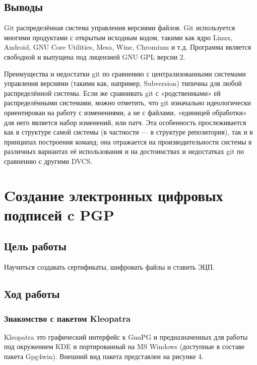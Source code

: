 \documentclass[a4paper, 12pt]{article}		%
\begin{document}
\subsection{Выводы}

Git распределённая система управления версиями файлов. Git используется многими продуктами с открытым исходным кодом, такими как ядро Linux, Android, GNU Core Utilities, Mesa, Wine, Chromium и т.д. Программа является свободной и выпущена под лицензией GNU GPL версии 2.

Преимущества и недостатки git по сравнению с централизованными системами управления версиями (такими как, например, Subversion) типичны для любой распределённой системы. Если же сравнивать git с «родственными» ей распределёнными системами, можно отметить, что git изначально идеологически ориентирован на работу с изменениями, а не с файлами, «единицей обработки» для него является набор изменений, или патч. Эта особенность прослеживается как в структуре самой системы (в частности — в структуре репозитория), так и в принципах построения команд; она отражается на производительности системы в различных вариантах её использования и на достоинствах и недостатках git по сравнению с другими DVCS.

\newpage
\section{Cоздание электронных цифровых подписей c PGP}

\subsection{Цель работы}
Научиться создавать сертификаты, шифровать файлы и ставить ЭЦП.

\subsection{Ход работы}

\subsubsection{Знакомство с пакетом Kleopatra}

Kleopatra это графический интерфейс к GnuPG и предназначенных для работы под окружением KDE и портированный на MS Windows (доступные в составе пакета Gpg4win). Внешний вид пакета представлен на рисунке 4.
\end{document}
